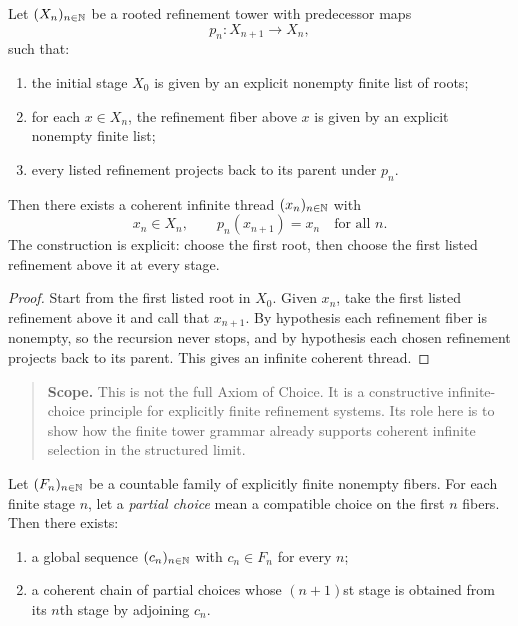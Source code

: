 \begin{proposition}
\label{prop:structured-infinite-choice}
Let $(X_n)_{n\in\mathbb{N}}$ be a rooted refinement tower with predecessor maps
\[
p_n : X_{n+1} \to X_n,
\]
such that:
\begin{enumerate}[label=(\roman*),itemsep=0.2em]
\item the initial stage $X_0$ is given by an explicit nonempty finite list of roots;
\item for each $x \in X_n$, the refinement fiber above $x$ is given by an explicit nonempty finite list;
\item every listed refinement projects back to its parent under $p_n$.
\end{enumerate}
Then there exists a coherent infinite thread $(x_n)_{n\in\mathbb{N}}$ with
\[
x_n \in X_n,
\qquad
p_n(x_{n+1}) = x_n
\quad\text{for all }n.
\]
The construction is explicit: choose the first root, then choose the first listed refinement above it at every stage.
\end{proposition}

\begin{proof}
Start from the first listed root in $X_0$. Given $x_n$, take the first listed refinement above it and call that $x_{n+1}$. By hypothesis each refinement fiber is nonempty, so the recursion never stops, and by hypothesis each chosen refinement projects back to its parent. This gives an infinite coherent thread.
\end{proof}

\begin{quote}\small
\textbf{Scope.} This is not the full Axiom of Choice. It is a constructive infinite-choice principle for explicitly finite refinement systems. Its role here is to show how the finite tower grammar already supports coherent infinite selection in the structured limit.
\end{quote}

\begin{corollary}
\label{cor:countable-structured-choice}
Let $(F_n)_{n\in\mathbb{N}}$ be a countable family of explicitly finite nonempty fibers. For each finite stage $n$, let a \emph{partial choice} mean a compatible choice on the first $n$ fibers. Then there exists:
\begin{enumerate}[label=(\roman*),itemsep=0.2em]
\item a global sequence $(c_n)_{n\in\mathbb{N}}$ with $c_n \in F_n$ for every $n$;
\item a coherent chain of partial choices whose $(n+1)$st stage is obtained from its $n$th stage by adjoining $c_n$.
\end{enumerate}
\end{corollary}

